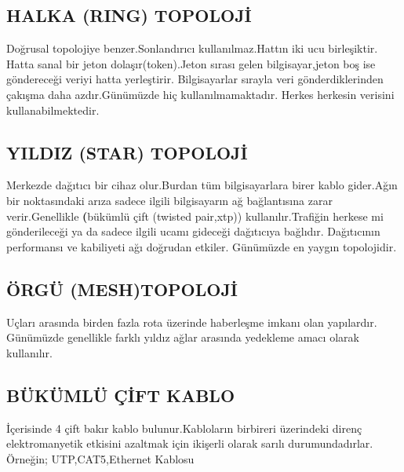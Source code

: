\subsection*{HALKA (RING) TOPOLOJİ}
Doğrusal topolojiye benzer.Sonlandırıcı kullanılmaz.Hattın iki ucu birleşiktir.
Hatta sanal  bir jeton dolaşır(token).Jeton sırası gelen bilgisayar,jeton boş ise göndereceği veriyi hatta yerleştirir.
Bilgisayarlar sırayla  veri gönderdiklerinden çakışma daha azdır.Günümüzde hiç kullanılmamaktadır.
Herkes herkesin verisini kullanabilmektedir.
%

\subsection*{YILDIZ (STAR) TOPOLOJİ}
Merkezde dağıtıcı bir cihaz olur.Burdan tüm bilgisayarlara birer kablo gider.Ağın bir noktasındaki arıza sadece ilgili bilgisayarın ağ bağlantısına zarar verir.Genellikle \textbf(bükümlü çift (twisted pair,xtp)) kullanılır.Trafiğin herkese mi gönderileceği ya da sadece ilgili ucamı gideceği dağıtıcıya bağlıdır.
Dağıtıcının  performansı ve kabiliyeti ağı doğrudan  etkiler.
Günümüzde en yaygın topolojidir.

\subsection*{ÖRGÜ (MESH)TOPOLOJİ}
Uçları arasında birden fazla rota üzerinde haberleşme imkanı olan yapılardır.
Günümüzde genellikle farklı yıldız ağlar arasında yedekleme amacı olarak kullanılır.


\subsection{BÜKÜMLÜ ÇİFT KABLO}
  İçerisinde 4 çift bakır kablo bulunur.Kabloların birbireri üzerindeki direnç elektromanyetik etkisini azaltmak için ikişerli olarak sarılı durumundadırlar.
  Örneğin; UTP,CAT5,Ethernet Kablosu 

